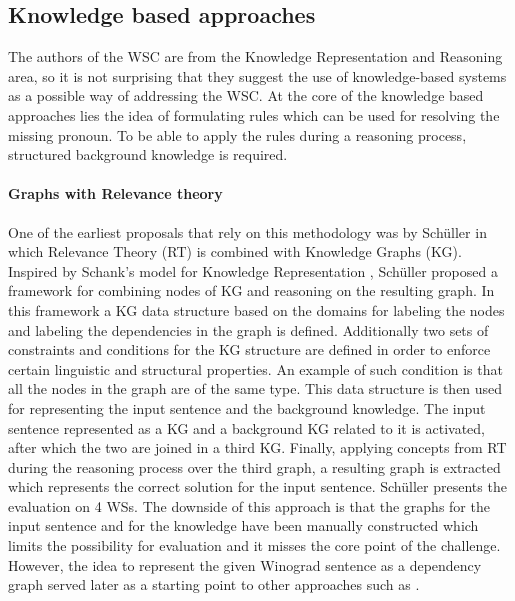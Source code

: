\subsection{Knowledge based approaches}
The authors of the WSC are from the Knowledge Representation and Reasoning area, so it is not surprising that they suggest the use of knowledge-based systems as a possible way of addressing the WSC. At the core of the knowledge based approaches lies the idea of formulating rules which can be used for resolving the missing pronoun. To be able to apply the rules during a reasoning process, structured background knowledge is required.

\paragraph{Graphs with Relevance theory}
One of the earliest proposals that rely on this methodology was by Sch{\"u}ller \cite{DBLP:conf/kr/Schuller14} in which Relevance Theory (RT) \cite{Wilson2002-WILRT} is combined with Knowledge Graphs (KG). Inspired by Schank's model for Knowledge Representation \cite{SCHANK1972552}, Sch{\"u}ller proposed a framework for combining nodes of KG and reasoning on the resulting graph. 
In this framework a KG data structure based on the domains for labeling the nodes and labeling the dependencies in the graph is defined. Additionally two sets of constraints and conditions for the KG structure are defined in order to enforce certain linguistic and structural properties. An example of such condition is that all the nodes in the graph are of the same type.  This data structure is then used for representing the input sentence and the background knowledge. 
The input sentence represented as a KG and a background KG related to it is activated, after which the two are joined in a third KG. Finally, applying concepts from RT during the reasoning process over the third graph, a resulting graph is extracted which represents the correct solution for the input sentence. Sch{\"u}ller \cite{DBLP:conf/kr/Schuller14} presents the evaluation on 4 WSs. The downside of this approach is that the graphs for the input sentence and for the knowledge have been manually constructed which limits the possibility for evaluation and it misses the core point of the challenge. However, the idea to represent the given Winograd sentence as a dependency graph served later as a starting point to other approaches such as \cite{DBLP:conf/ijcai/SharmaVAB15}.


